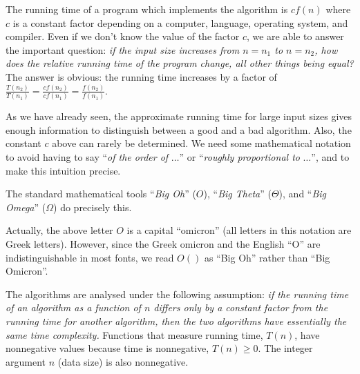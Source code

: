 The running time of a program which implements
the algorithm is $c  f(n)$ where $c$ is a constant factor depending
on a computer, language, operating system, and compiler. Even if we don't know 
the value of the factor \(c\), we are able to answer the important question:
\emph{if the input size increases from $n=n_{1}$ to $n=n_{2}$, how does
the relative running time of the program change, all other things being equal?}
The answer is obvious: the 
running time increases by a factor of 
\( 
\frac{T(n_{2})}{T(n_{1})} = 
\frac{c  f(n_{2})}{c  f(n_{1})} =  
\frac{f(n_{2})}{f(n_{1})}
\). 

As we have already seen, the approximate running time for large input
sizes gives enough information to distinguish between a good and a bad
algorithm. Also, the constant $c$ above can rarely be determined. We
need some mathematical notation to avoid having to say ``\emph{of the
order of} $\ldots$''  or ``\emph{roughly proportional to} $\ldots$'',
and to make this intuition precise.

The standard mathematical tools ``\emph{Big Oh}'' ($O$), ``\emph{Big
Theta}'' ($\Theta$), and ``\emph{Big Omega}'' ($\Omega$) do 
precisely this.

\begin{note}
Actually, the above letter $O$ is a capital ``omicron''  (all
letters in this notation are Greek letters). However, since the Greek
omicron and the English ``O'' are indistinguishable in most fonts, we
read $O()$ as ``Big Oh'' rather than ``Big Omicron''. 
\end{note}

The algorithms are analysed under the following assumption: \emph{if
the running time of an algorithm as a function of $n$ differs only by a
constant factor from the  running time for another algorithm, then the
two algorithms have essentially the same time complexity.} Functions that
measure running time, $T(n)$, have nonnegative values because time is
nonnegative, $T(n) \ge 0$. The integer argument $n$ (data size) is also
nonnegative.

